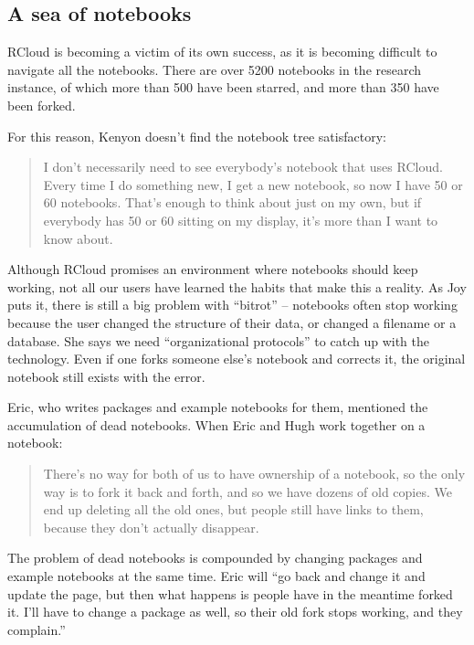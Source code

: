 \subsection{A sea of notebooks}
RCloud is becoming a victim of its own success, as it is becoming
difficult to navigate all the notebooks.  There are over 5200 notebooks in
the research instance, of which more than 500 have been starred, and more
than 350 have been forked.

For this reason, Kenyon doesn't find the notebook tree satisfactory:
\begin{quote}
I don't necessarily need to see everybody's notebook that uses RCloud. Every
time I do something new, I get a new notebook, so now I have 50 or 60 notebooks.
That's enough to think about just on my own, but if everybody has
50 or 60 sitting on my display, it's more than I want to know about.
\end{quote}

Although RCloud promises an environment where notebooks should keep working,
not all our users have learned the habits that make this a reality. As Joy
puts it, there is still a big problem with ``bitrot'' -- notebooks often
stop working because the user changed the structure of their data, or
changed a filename or a database.  She says we need ``organizational
protocols'' to catch up with the technology. Even if one forks someone
else's notebook and corrects it, the original notebook still exists with
the error.


Eric, who writes packages and example notebooks for them, mentioned the
accumulation of dead notebooks. When Eric and Hugh work together on a notebook:
\begin{quote}
There's no way for both of us to have ownership of a notebook, so the only
way is to fork it back and forth, and so we have dozens of old copies. We
end up deleting all the old ones, but people still have links to them,
because they don't actually disappear.
\end{quote}

The problem of dead notebooks is compounded by changing
packages and example notebooks at the same time. Eric will ``go back and
change it and update the page, but then what happens is people have in the
meantime forked it. I'll have to change a package as well, so their
old fork stops working, and they complain.''

